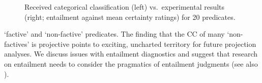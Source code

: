 \documentclass[12pt,fleqn]{article}
\newcommand{\6}{\mbox{$[\hspace*{-.6mm}[$}}
\newcommand{\9}{\mbox{$]\hspace*{-.6mm}]$}}
\begin{document}
\begin{figure}
\caption{Received categorical classification (left) vs.\ experimental results (right; entailment against mean certainty ratings) for 20 predicates.}\label{f-summary-categorical}

\end{figure}

\noindent
`factive' and `non-factive' predicates.  The finding that the CC of many `non-factives' is projective points to exciting, uncharted territory for future projection analyses. We discuss issues with entailment diagnostics and suggest that research on entailment needs to consider the pragmatics of entailment judgments (see also \cite{demarneffe-etal2012}).

%
%
%

\newpage


\end{document}
